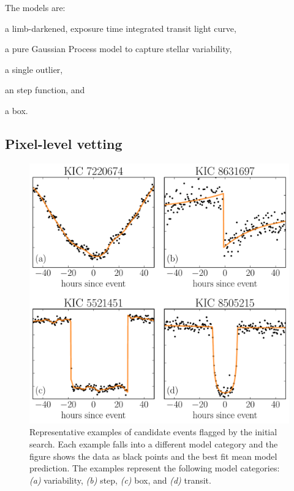 \documentclass[onecolumn]{aastex6}
\newcommand{\figlabel}[1]{\label{fig:#1}}
\begin{document}
The models are:
\begin{itemize}
{\item a limb-darkened, exposure time integrated transit light curve,}
{\item a pure Gaussian Process model to capture stellar variability,}
{\item a single outlier,}
{\item an step function, and}
{\item a box.}
\end{itemize}


\subsection{Pixel-level vetting}


\begin{figure}
\begin{center}
\includegraphics[width=\textwidth]{figures/model_comp.pdf}
\end{center}
\caption{%
Representative examples of candidate events flagged by the initial search.
Each example falls into a different model category and the figure shows the
data as black points and the best fit mean model prediction.
The examples represent the following model categories:
\emph{(a)} variability, \emph{(b)} step, \emph{(c)} box, and \emph{(d)}
transit.
\figlabel{model-comp}}
\end{figure}
\end{document}
